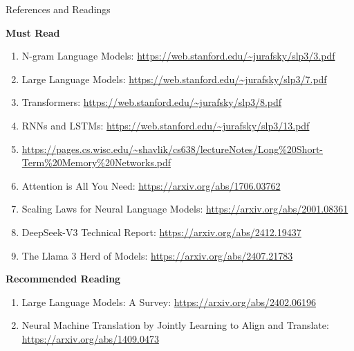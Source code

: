 \documentclass[aspectratio=169,xcolor=dvipsnames,svgnames,x11names,fleqn]{beamer}
\begin{document}
\begin{frame}{References and Readings}

\footnotesize

\textbf{Must Read}

\begin{enumerate}
\item N-gram Language Models: \url{https://web.stanford.edu/~jurafsky/slp3/3.pdf}
\item Large Language Models: \url{https://web.stanford.edu/~jurafsky/slp3/7.pdf}
\item Transformers: \url{https://web.stanford.edu/~jurafsky/slp3/8.pdf}
\item RNNs and LSTMs: \url{https://web.stanford.edu/~jurafsky/slp3/13.pdf}
\item \url{https://pages.cs.wisc.edu/~shavlik/cs638/lectureNotes/Long\%20Short-Term\%20Memory\%20Networks.pdf}
\item Attention is All You Need: \url{https://arxiv.org/abs/1706.03762}
\item Scaling Laws for Neural Language Models: \url{https://arxiv.org/abs/2001.08361}
\item DeepSeek-V3 Technical Report: \url{https://arxiv.org/abs/2412.19437}
\item The Llama 3 Herd of Models: \url{https://arxiv.org/abs/2407.21783}

\end{enumerate}

\textbf{Recommended Reading}

\begin{enumerate}

\item Large Language Models: A Survey: \url{https://arxiv.org/abs/2402.06196}
\item Neural Machine Translation by Jointly Learning to Align and Translate: \url{https://arxiv.org/abs/1409.0473}

\end{enumerate}

\end{frame}
\end{document}
